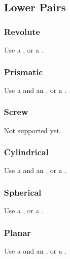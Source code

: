 \subsection{Lower Pairs}

\subsubsection{Revolute}
Use a , or a .

\subsubsection{Prismatic}
Use a  and an , or a .

\subsubsection{Screw}
Not supported yet.

\subsubsection{Cylindrical}
Use a  and an , or a .

\subsubsection{Spherical}
Use a , or a .

\subsubsection{Planar}
Use a  and an , or a .




